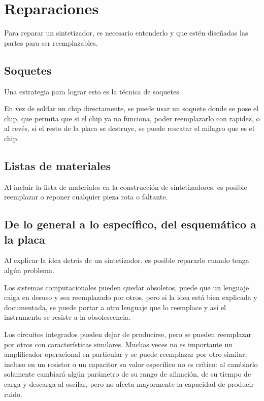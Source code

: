 \documentclass[../candidatura.tex]{subfiles}
\begin{document}
\section{Reparaciones}

\avisoesbozo

Para reparar un sintetizador, es necesario entenderlo y que estén diseñadas las partes para ser reemplazables.

\subsection{Soquetes}

Una estrategia para lograr esto es la técnica de soquetes.

En vez de soldar un chip directamente, se puede usar un soquete donde se pose el chip, que permita que si el chip ya no funciona, poder reemplazarlo con rapidez, o al revés, si el resto de la placa se destruye, se puede rescatar el milagro que es el chip.

\subsection{Listas de materiales}

Al incluir la lista de materiales en la construcción de sintetizadores, es posible reemplazar o reponer cualquier pieza rota o faltante.


\subsection{De lo general a lo específico, del esquemático a la placa}

Al explicar la idea detrás de un sintetizador, es posible repararlo cuando tenga algún problema.

Los sistemas computacionales pueden quedar obsoletos, puede que un lenguaje caiga en desuso y sea reemplazado por otros, pero si la idea está bien explicada y documentada, se puede portar a otro lenguaje que lo reemplace y así el instrumento se resiste a la obsolescencia.

Los circuitos integrados pueden dejar de producirse, pero se pueden reemplazar por otros con características similares. Muchas veces no es importante un amplificador operacional en particular y se puede reemplazar por otro similar; incluso en un resistor o un capacitor su valor específico no es crítico: al cambiarlo solamente cambiará algún parámetro de su rango de afinación, de su tiempo de carga y descarga al oscilar, pero no afecta mayormente la capacidad de producir ruido.

\newpage
\end{document}
